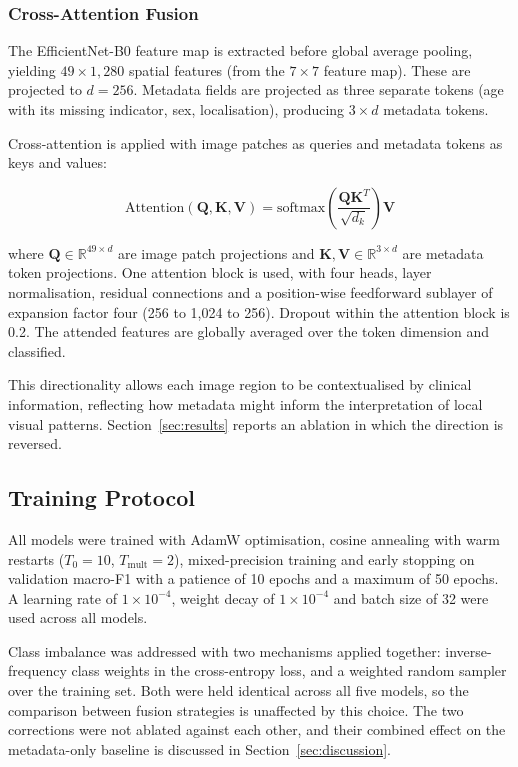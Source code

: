 \documentclass[conference]{IEEEtran}
\begin{document}
\subsubsection{Cross-Attention Fusion}
The EfficientNet-B0 feature map is extracted before global average pooling, yielding $49 \times 1{,}280$ spatial features (from the $7 \times 7$ feature map). These are projected to $d = 256$. Metadata fields are projected as three separate tokens (age with its missing indicator, sex, localisation), producing $3 \times d$ metadata tokens.

Cross-attention is applied with image patches as queries and metadata tokens as keys and values:

\begin{equation}
\text{Attention}(\mathbf{Q}, \mathbf{K}, \mathbf{V}) = \text{softmax}\left(\frac{\mathbf{Q}\mathbf{K}^T}{\sqrt{d_k}}\right)\mathbf{V}
\end{equation}

where $\mathbf{Q} \in \mathbb{R}^{49 \times d}$ are image patch projections and $\mathbf{K}, \mathbf{V} \in \mathbb{R}^{3 \times d}$ are metadata token projections. One attention block is used, with four heads, layer normalisation, residual connections and a position-wise feedforward sublayer of expansion factor four (256 to 1,024 to 256). Dropout within the attention block is 0.2. The attended features are globally averaged over the token dimension and classified.

This directionality allows each image region to be contextualised by clinical information, reflecting how metadata might inform the interpretation of local visual patterns. Section~\ref{sec:results} reports an ablation in which the direction is reversed.

\subsection{Training Protocol}

All models were trained with AdamW optimisation, cosine annealing with warm restarts ($T_0 = 10$, $T_{\text{mult}} = 2$), mixed-precision training and early stopping on validation macro-F1 with a patience of 10 epochs and a maximum of 50 epochs. A learning rate of $1 \times 10^{-4}$, weight decay of $1 \times 10^{-4}$ and batch size of 32 were used across all models.

Class imbalance was addressed with two mechanisms applied together: inverse-frequency class weights in the cross-entropy loss, and a weighted random sampler over the training set. Both were held identical across all five models, so the comparison between fusion strategies is unaffected by this choice. The two corrections were not ablated against each other, and their combined effect on the metadata-only baseline is discussed in Section~\ref{sec:discussion}.
\end{document}
